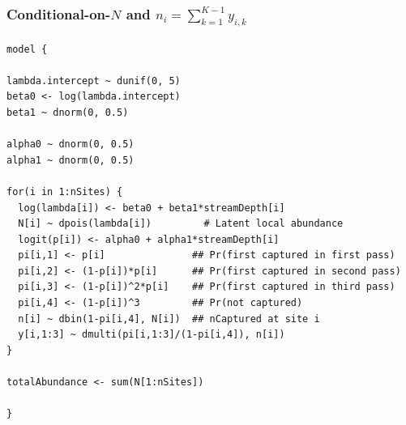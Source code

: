 \documentclass[color=usenames,dvipsnames]{beamer}\usepackage[]{graphicx}\usepackage[]{color}
\makeatletter
\newenvironment{kframe}{%
 \def\at@end@of@kframe{}%
 \ifinner\ifhmode%
  \def\at@end@of@kframe{\end{minipage}}%
  \begin{minipage}{\columnwidth}%
 \fi\fi%
 \def\FrameCommand##1{\hskip\@totalleftmargin \hskip-\fboxsep
 \colorbox{shadecolor}{##1}\hskip-\fboxsep
     \hskip-\linewidth \hskip-\@totalleftmargin \hskip\columnwidth}%
 \MakeFramed {\advance\hsize-\width
   \@totalleftmargin\z@ \linewidth\hsize
   \@setminipage}}%
 {\par\unskip\endMakeFramed%
 \at@end@of@kframe}
\newenvironment{knitrout}{}{} %
\makeatother
\begin{document}
\begin{frame}[fragile]
  \frametitle{\normalsize Conditional-on-$N$ and $n_i=\sum_{k=1}^{K-1} y_{i,k}$}
\vspace{-3pt}
\begin{knitrout}\scriptsize
{}\color{fgcolor}\begin{kframe}
\begin{verbatim}
model {

lambda.intercept ~ dunif(0, 5)
beta0 <- log(lambda.intercept)
beta1 ~ dnorm(0, 0.5)

alpha0 ~ dnorm(0, 0.5)  
alpha1 ~ dnorm(0, 0.5)

for(i in 1:nSites) {
  log(lambda[i]) <- beta0 + beta1*streamDepth[i]
  N[i] ~ dpois(lambda[i])         # Latent local abundance
  logit(p[i]) <- alpha0 + alpha1*streamDepth[i]
  pi[i,1] <- p[i]               ## Pr(first captured in first pass)
  pi[i,2] <- (1-p[i])*p[i]      ## Pr(first captured in second pass)
  pi[i,3] <- (1-p[i])^2*p[i]    ## Pr(first captured in third pass)
  pi[i,4] <- (1-p[i])^3         ## Pr(not captured)
  n[i] ~ dbin(1-pi[i,4], N[i])  ## nCaptured at site i
  y[i,1:3] ~ dmulti(pi[i,1:3]/(1-pi[i,4]), n[i])
}

totalAbundance <- sum(N[1:nSites])

}
\end{verbatim}
\end{kframe}
\end{knitrout}
\end{frame}
\end{document}
